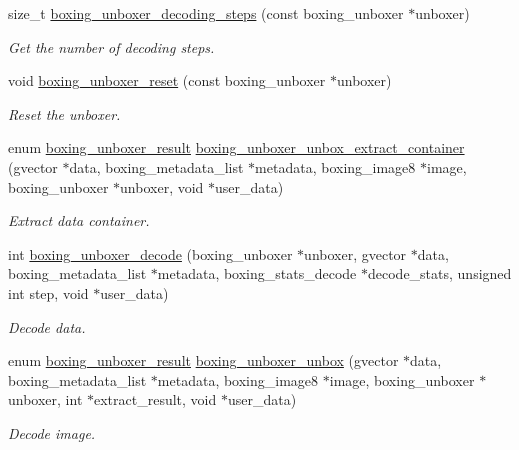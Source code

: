 \begin{DoxyCompactItemize}
size\_\-t \hyperlink{group__unboxer_gab8716d553639132ce7fc268c4c7a2c50}{boxing\_\-unboxer\_\-decoding\_\-steps} (const boxing\_\-unboxer $\ast$unboxer)
\begin{DoxyCompactList}\small\item\em Get the number of decoding steps. \item\end{DoxyCompactList}\item 
void \hyperlink{group__unboxer_ga16c59852a340d2d593efb5beec2ac5b2}{boxing\_\-unboxer\_\-reset} (const boxing\_\-unboxer $\ast$unboxer)
\begin{DoxyCompactList}\small\item\em Reset the unboxer. \item\end{DoxyCompactList}\item 
enum \hyperlink{group__unboxer_ga6c7b8f994da998dcd78b154856064ca6}{boxing\_\-unboxer\_\-result} \hyperlink{group__unboxer_gabdb1dfbc5aa0dc72aa2f75a62acb827d}{boxing\_\-unboxer\_\-unbox\_\-extract\_\-container} (gvector $\ast$data, boxing\_\-metadata\_\-list $\ast$metadata, boxing\_\-image8 $\ast$image, boxing\_\-unboxer $\ast$unboxer, void $\ast$user\_\-data)
\begin{DoxyCompactList}\small\item\em Extract data container. \item\end{DoxyCompactList}\item 
int \hyperlink{group__unboxer_gaeba1508d04d3ba66f4ec5acd2ea71244}{boxing\_\-unboxer\_\-decode} (boxing\_\-unboxer $\ast$unboxer, gvector $\ast$data, boxing\_\-metadata\_\-list $\ast$metadata, boxing\_\-stats\_\-decode $\ast$decode\_\-stats, unsigned int step, void $\ast$user\_\-data)
\begin{DoxyCompactList}\small\item\em Decode data. \item\end{DoxyCompactList}\item 
enum \hyperlink{group__unboxer_ga6c7b8f994da998dcd78b154856064ca6}{boxing\_\-unboxer\_\-result} \hyperlink{group__unboxer_ga832bea46817eb5b565687abc0d7635fd}{boxing\_\-unboxer\_\-unbox} (gvector $\ast$data, boxing\_\-metadata\_\-list $\ast$metadata, boxing\_\-image8 $\ast$image, boxing\_\-unboxer $\ast$unboxer, int $\ast$extract\_\-result, void $\ast$user\_\-data)
\begin{DoxyCompactList}\small\item\em Decode image. \item\end{DoxyCompactList}\item 

\end{DoxyCompactItemize}
